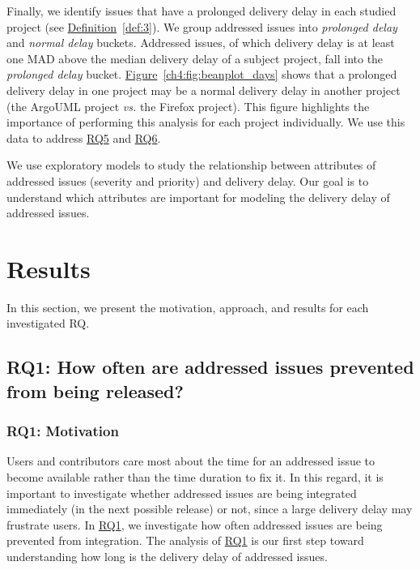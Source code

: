 Finally, we identify issues that have a prolonged delivery delay in each studied
project (see \hyperref[def:3]{Definition}~\ref{def:3}). We group addressed
issues into \textit{prolonged delay} and \textit{normal delay} buckets.
Addressed issues, of which delivery delay is at least one MAD above the median
delivery delay of a subject project, fall into the \textit{prolonged delay}
bucket.  \hyperref[ch4:fig:beanplot_days]{Figure}~\ref{ch4:fig:beanplot_days}
shows that a prolonged delivery delay in one project may be a normal delivery
delay in another project (\eg the ArgoUML project {\em vs.} the Firefox
project). This figure highlights the importance of performing this analysis for
each project individually. We use this data to address \hyperref[ch4:rq5]{RQ5}
and \hyperref[ch4:rq6]{RQ6}.

We use exploratory models to study the relationship between attributes of
addressed issues (\eg severity and priority) and delivery delay. Our goal is to
understand which attributes are important for modeling the delivery delay of
addressed issues. \\

\section{Results} \label{ch3:results}

In this section, we present the motivation, approach, and results for each
investigated RQ. 

\subsection{RQ1: How often are addressed issues prevented
from being released?}\label{ch4:rq1}

\subsubsection*{RQ1: Motivation}

Users and contributors care most about the time for an addressed issue to become
available rather than the time duration to fix it. In this regard, it is
important to investigate whether addressed issues are being integrated immediately
(\eg in the next possible release) or not, since a large delivery delay may
frustrate users. In \hyperref[ch:rq1]{RQ1}, we investigate how often addressed issues are being
prevented from integration. The analysis of \hyperref[ch:rq1]{RQ1} is our first step toward
understanding how long is the delivery delay of addressed issues.

